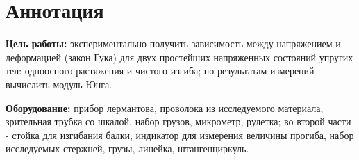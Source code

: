 \section{Аннотация}
\textbf{Цель работы:} экспериментально получить зависимость между напряжением и деформацией (закон Гука) для двух простейших напряженных состояний упругих тел: одноосного растяжения и чистого изгиба; по результатам измерений вычислить модуль Юнга.

\textbf{Оборудование:} прибор лермантова, проволока из исследуемого материала, зрительная трубка со шкалой, набор грузов, микрометр, рулетка; во второй части - стойка для изгибания балки, индикатор для измерения величины прогиба, набор исследуемых стержней, грузы, линейка, штангенциркуль.


